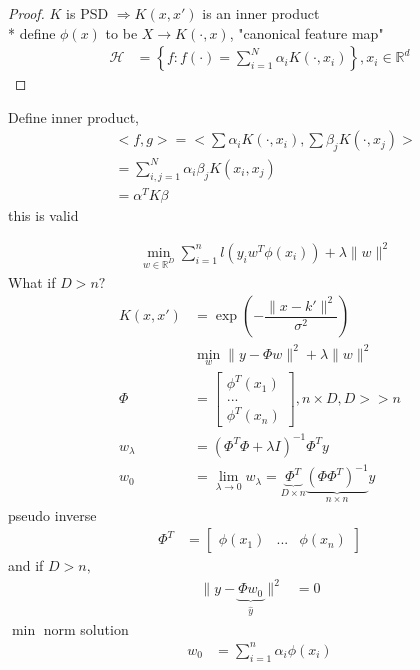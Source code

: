 \documentclass{article}
\begin{document}
\begin{proof} \label{proof:hil2} 
$K $ is PSD $\Rightarrow  K\left(x, x'\right)$ is an inner product
\\* define $\phi\left(x\right)$ to be $X  \to  K\left(\cdot , x \right)$, "canonical feature map"
\begin{align*}
\mathcal{H} &= \left\{f : f\left(\cdot \right) = \displaystyle\sum_{i=1}^{N} \alpha_{i} K\left(\cdot , x_{i}\right)\right\}, x_{i} \in \mathbb{R}^{d}
\end{align*}\end{proof}
Define inner product,
\begin{align*}
&< f, g > = < \displaystyle\sum \alpha_{i} K\left(\cdot  , x_{i}\right), \displaystyle\sum \beta_{j} K\left(\cdot , x_{j}\right) >
\\ &= \displaystyle\sum_{i,j=1}^{N} \alpha_{i} \beta_{j} K\left(x_{i}, x_{j}\right)
\\ &= \alpha^{T} K \beta
\end{align*}
this is valid

\begin{align*}
&\displaystyle\min_{w \in \mathbb{R}^{D}} \displaystyle\sum_{i=1}^{n} l\left(y_{i} w^{T} \phi\left(x_{i}\right)\right) + \lambda \| w \|^{2}
\end{align*}
What if $D  > n? $
\begin{align*}
K\left(x, x'\right)  &= \exp\left(- \dfrac{\| x - k' \|^{2}}{\sigma^{2}}\right)
\\ &\displaystyle\min_{w} \| y - \Phi w \|^{2} + \lambda \| w \|^{2}
\\ \Phi &= \begin{bmatrix} \phi^{T}\left(x_{1}\right) \\ ... \\ \phi^{T}\left(x_{n}\right) \end{bmatrix} , n  \times D, D >> n 
\\ w_{\lambda} &= \left(\Phi^{T} \Phi + \lambda I\right)^{-1} \Phi^{T} y 
\\ w_{0} &= \lim_{\lambda \to  0} w_{\lambda} = \underbrace{\Phi^{T}}_{D \times n} \underbrace{\left(\Phi \Phi^{T}\right)^{-1}}_{n \times n} y 
\end{align*}
pseudo inverse
\begin{align*}
\Phi^{T} &= \begin{bmatrix} \phi\left(x_{1}\right) & ... & \phi\left(x_{n}\right) \end{bmatrix}
\end{align*}
and if $D  > n, $
\begin{align*}
\| y - \underbrace{\Phi w_{0}}_{\hat{y}} \|^{2} &= 0
\end{align*}
$\displaystyle\min$ norm solution
\begin{align*}
w_{0} &= \displaystyle\sum_{i=1}^{n} \alpha_{i} \phi\left(x_{i}\right)
\end{align*}
\end{document}
